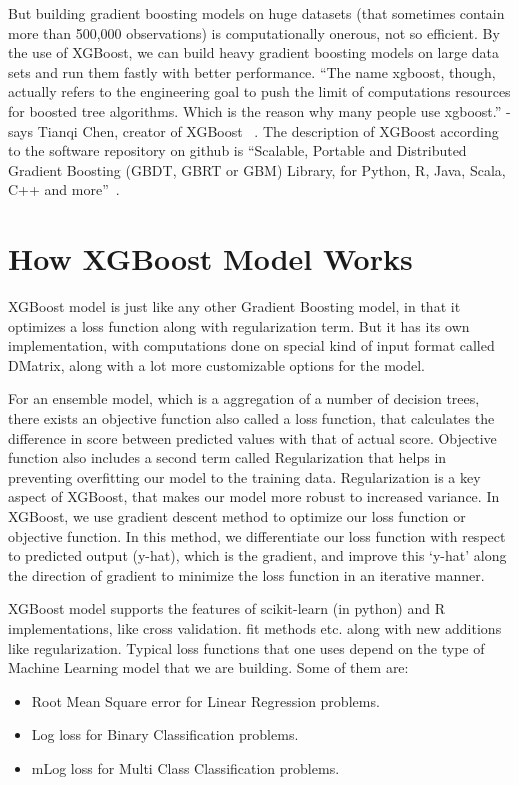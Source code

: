 But building gradient boosting models on huge datasets (that sometimes contain
more than 500,000 observations) is computationally onerous, not so efficient.
By the use of XGBoost, we can build heavy gradient boosting models on large
data sets and run them fastly with better performance. ``The name xgboost,
though, actually refers to the engineering goal to push the limit of
computations resources for boosted tree algorithms. Which is the reason why
many people use xgboost.'' - says Tianqi Chen, creator of XGBoost
~\cite{hid-sp18-401-XGBoost-MLmastery}. The description of XGBoost according 
to the software repository on github is ``Scalable, Portable and Distributed 
Gradient Boosting (GBDT, GBRT or GBM) Library, for Python, R, Java, Scala, 
C++ and more''~\cite{hid-sp18-401-XGBoost-Github}.


\section{How XGBoost Model Works}

XGBoost model is just like any other Gradient Boosting model, in that it
optimizes a loss function  along with regularization term. But it has its own
implementation, with computations done on special kind of input format called
DMatrix, along with a lot more customizable options for the model.
 
For an ensemble model, which is a aggregation of a number of decision trees,
there exists an objective function also called a loss function, that
calculates the difference in score between predicted values with that of
actual score. Objective function also includes a second term called
Regularization that helps in preventing overfitting our model to the training
data. Regularization is a key aspect of XGBoost, that makes our model more
robust to increased variance. In XGBoost, we use gradient descent method to
optimize our loss function or objective function. In this method, we
differentiate our loss function with respect to predicted output (y-hat),
which is the gradient, and improve this `y-hat' along the direction of
gradient to minimize the loss function in an iterative manner.

XGBoost model supports the features of scikit-learn (in python) and R
implementations, like cross validation. fit methods etc. along with new
additions like regularization.  Typical loss functions that one uses depend on
the type of Machine Learning model that we are building. Some of them are:

\begin{itemize}
\item Root Mean Square error for Linear Regression problems. 
\item Log loss for Binary Classification problems. 
\item mLog loss for Multi Class Classification problems.
\end{itemize}

